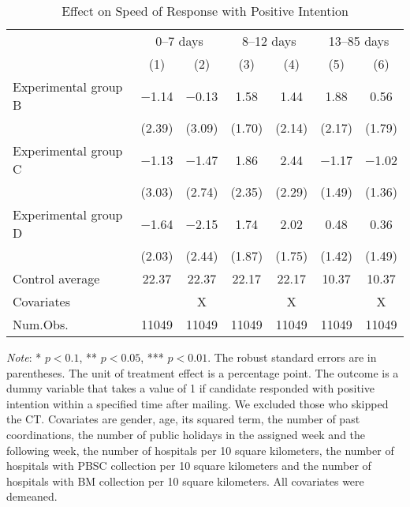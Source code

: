 \documentclass[12pt, a4paper]{article}
\begin{document}
\begin{table}[H]

\caption{\label{tab:lm-positive-time-decompose}Effect on Speed of Response with Positive Intention}
\centering
\fontsize{8}{10}\selectfont
\begin{threeparttable}
\begin{tabular}[t]{>{\raggedright\arraybackslash}p{20em}cccccc}
\toprule
\multicolumn{1}{c}{ } & \multicolumn{2}{c}{0--7 days} & \multicolumn{2}{c}{8--12 days} & \multicolumn{2}{c}{13--85 days} \\
\cmidrule(l{3pt}r{3pt}){2-3} \cmidrule(l{3pt}r{3pt}){4-5} \cmidrule(l{3pt}r{3pt}){6-7}
  & (1) & (2) & (3) & (4) & (5) & (6)\\
\midrule
Experimental group B & \num{-1.14} & \num{-0.13} & \num{1.58} & \num{1.44} & \num{1.88} & \num{0.56}\\
 & (\num{2.39}) & (\num{3.09}) & (\num{1.70}) & (\num{2.14}) & (\num{2.17}) & (\num{1.79})\\
Experimental group C & \num{-1.13} & \num{-1.47} & \num{1.86} & \num{2.44} & \num{-1.17} & \num{-1.02}\\
 & (\num{3.03}) & (\num{2.74}) & (\num{2.35}) & (\num{2.29}) & (\num{1.49}) & (\num{1.36})\\
Experimental group D & \num{-1.64} & \num{-2.15} & \num{1.74} & \num{2.02} & \num{0.48} & \num{0.36}\\
 & (\num{2.03}) & (\num{2.44}) & (\num{1.87}) & (\num{1.75}) & (\num{1.42}) & (\num{1.49})\\
\midrule
Control average & 22.37 & 22.37 & 22.17 & 22.17 & 10.37 & 10.37\\
Covariates &  & X &  & X &  & X\\
Num.Obs. & \num{11049} & \num{11049} & \num{11049} & \num{11049} & \num{11049} & \num{11049}\\
\bottomrule
\end{tabular}
\begin{tablenotes}
\item \emph{Note}: * $p < 0.1$, ** $p < 0.05$, *** $p < 0.01$. The robust standard errors are in parentheses. The unit of treatment effect is a percentage point. The outcome is a dummy variable that takes a value of 1 if candidate responded with positive intention within a specified time after mailing. We excluded those who skipped the CT. Covariates are gender, age, its squared term, the number of past coordinations, the number of public holidays in the assigned week and the following week, the number of hospitals per 10 square kilometers, the number of hospitals with PBSC collection per 10 square kilometers and the number of hospitals with BM collection per 10 square kilometers. All covariates were demeaned.
\end{tablenotes}
\end{threeparttable}
\end{table}
\end{document}
